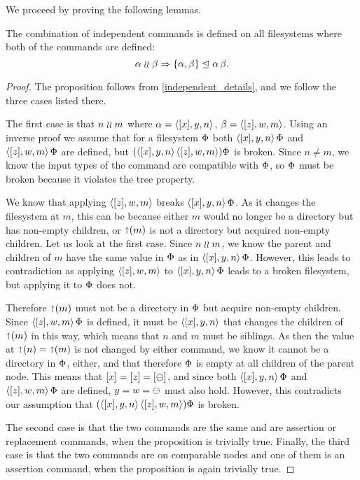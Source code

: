 We proceed by proving the following lemmas.

\begin{mylem}
The combination of independent commands is defined on all filesystems
where both of the commands are defined:
\[ \alpha\mathrel{\wr\wr} \beta \Rightarrow {\{{\alpha, \beta}\}}\trianglelefteq{\alpha\,\beta}. \]
\end{mylem}
\begin{proof}
The proposition follows from \cref{independent_details},
and we follow the three cases listed there.

The first case is that $n\mathrel{\wr\wr} m$ where $\alpha=\langle{[x],y,n}\rangle$, $\beta=\langle{[z],w,m}\rangle$.
Using an inverse proof we assume that for a filesystem $\Phi$
both $\langle{[x],y,n}\rangle\,\Phi$ and $\langle{[z],w,m}\rangle\,\Phi$ are defined, but $(\langle{[x],y,n}\rangle\,\langle{[z],w,m}\rangle)\Phi$ is broken.
Since $n\neq m$, we know the input types of the command are compatible with $\Phi$,
so $\Phi$ must be broken because it violates the tree property.

We know that applying $\langle{[z],w,m}\rangle$ breaks $\langle{[x],y,n}\rangle\,\Phi$. As it changes the filesystem
at $m$, this can be because either $m$ would no longer be a directory but has non-empty children,
or $\mathord{\shortuparrow}({m})$ is not a directory but acquired non-empty children.
Let us look at the first case.
Since $n\mathrel{\wr\wr} m$, we know the parent and children of $m$ have the same value
in $\Phi$ as in $\langle{[x],y,n}\rangle\,\Phi$. However, this leads to contradiction
as applying $\langle{[z],w,m}\rangle$ to $\langle{[x],y,n}\rangle\,\Phi$ leads to a broken filesystem, but
applying it to $\Phi$ does not.

Therefore $\mathord{\shortuparrow}({m})$ must not be a directory in $\Phi$ but acquire non-empty children.
Since $\langle{[z],w,m}\rangle\,\Phi$ is defined, it must be $\langle{[x],y,n}\rangle$ that changes the children of
$\mathord{\shortuparrow}({m})$ in this way, which means that $n$ and $m$ must be siblings.
As then the value at $\mathord{\shortuparrow}({n})=\mathord{\shortuparrow}({m})$ is not changed by either command,
we know it cannot be a directory in $\Phi$, either, and that therefore
$\Phi$ is empty at all children of the parent node.
This means that $[x]=[z]=[\ominus]$, and
since both $\langle{[x],y,n}\rangle\,\Phi$ and $\langle{[z],w,m}\rangle\,\Phi$ are defined, $y=w=\ominus$ must also hold.
However, this contradicts our assumption that $(\langle{[x],y,n}\rangle\,\langle{[z],w,m}\rangle)\Phi$ is broken.

The second case is that the two commands are the same and are assertion or replacement
commands, when the proposition is trivially true.
Finally, the third case is that the two commands are on comparable nodes and one of them
is an assertion command, when the proposition is again trivially true.
\end{proof}

